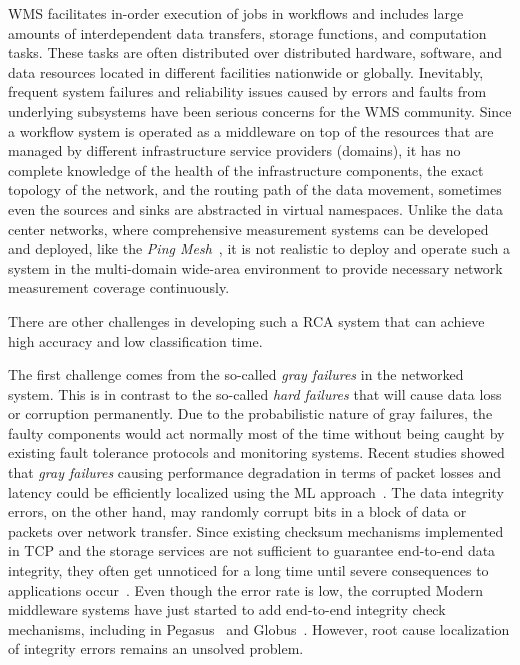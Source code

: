 WMS facilitates in-order execution of jobs in workflows and includes large amounts of interdependent
  data transfers, storage functions, and computation tasks. These tasks are often distributed over distributed hardware, software, and data resources 
  located in different facilities nationwide or globally. Inevitably, frequent system failures and reliability issues 
caused by errors and faults from underlying subsystems have been serious concerns for the WMS community. Since a workflow system is operated as a 
middleware on top of the resources that are managed by different infrastructure service providers (domains), it has no complete knowledge of the health of the infrastructure components, 
the exact topology of the network, and the routing path of the data movement, sometimes even the sources and sinks are abstracted in virtual namespaces. 
Unlike the data center networks, where comprehensive measurement systems can be developed and deployed, like the {\it Ping Mesh}~\cite{guo2015pingmesh}, 
it is not realistic to deploy and operate such a system in the multi-domain wide-area environment to provide necessary network measurement coverage continuously.  

There are other challenges in developing such a RCA system that can achieve high accuracy and low classification time.
 
The first challenge comes from the so-called {\it gray failures} in the networked system. This is in contrast to the so-called {\it hard failures} that will cause data loss or corruption permanently. 
Due to the probabilistic nature of gray failures, the faulty components would act normally most of the time without being caught by existing fault tolerance protocols and monitoring systems. 
Recent studies showed that {\it gray failures} causing performance degradation in terms of packet losses and latency could be efficiently localized using the ML approach~\cite{GrayFailure:2017,DeepView:NSDI18}.  
The data integrity errors, on the other hand, may randomly corrupt bits in a block of data or packets over network transfer. Since existing checksum mechanisms implemented in TCP and the storage services are not 
sufficient to guarantee end-to-end data integrity, they often get unnoticed for a long time until severe consequences to applications occur~\cite{swip:pearc:2019}. Even though the error rate is low, the corrupted  
Modern middleware systems have just started to add end-to-end integrity 
check mechanisms, including in Pegasus~\cite{deelman-fgcs-2015} and Globus~\cite{IntegrityVerification:DataTransfer}. However, root cause localization of integrity errors remains an unsolved problem.

